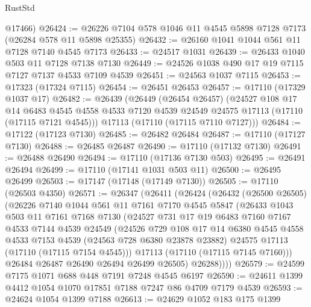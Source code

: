 \begin{lexlean}{RustStd}
\begin{coremodule}
      @17466)
@26424 := @26226 @7104 @578 @1046 @11 @4545 @5898 @7128 @7173 (@26284 @578 @11 @5898 @25355)
@26432 := @26160 @1041 @1044 @561 @11 @7128 @7140 @4545 @7173
@26433 := @24517 @1031
@26439 := @26433 @1040 @503 @11 @7128 @7138 @7130
@26449 := @24526 @1038 @490 @17 @19 @7115 @7127 @7137 @4533 @7109 @4539
@26451 := @24563 @1037 @7115
@26453 := @17323 (@17324 @7115)
@26454 := @26451 @26453
@26457 := @17110 (@17329 @1037 @17)
@26482 := @26439
    (@26449
      (@26454 @26457)
      (@24527
        @108
        @17
        @14
        @6483
        @4545
        @4558
        @4533
        @7120
        @4539
        @24549
        @24575
        @17113
        (@17110 (@17115 @7121 @4545)))
      @17113
      (@17110 (@17115 @7110 @7127)))
@26484 := @17122 (@17123 @7130)
@26485 := @26482 @26484
@26487 := @17110 (@17127 @7130)
@26488 := @26485 @26487
@26490 := @17110 (@17132 @7130)
@26491 := @26488 @26490
@26494 := @17110 (@17136 @7130 @503)
@26495 := @26491 @26494
@26499 := @17110 (@17141 @1031 @503 @11)
@26500 := @26495 @26499
@26503 := @17147 (@17148 (@17149 @7130))
@26505 := @17110 (@26503 @4350)
@26571 := @26347
    (@26411
      (@26424
        (@26432
          (@26500 @26505)
          (@26226
            @7140
            @1044
            @561
            @11
            @7161
            @7170
            @4545
            @5847
            (@26433
              @1043
              @503
              @11
              @7161
              @7168
              @7130
              (@24527
                @731
                @17
                @19
                @6483
                @7160
                @7167
                @4533
                @7144
                @4539
                @24549
                (@24526
                  @729
                  @108
                  @17
                  @14
                  @6380
                  @4545
                  @4558
                  @4533
                  @7153
                  @4539
                  (@24563 @728 @6380 @23878 @23882)
                  @24575
                  @17113
                  (@17110 (@17115 @7154 @4545)))
                @17113
                (@17110 (@17115 @7145 @7160)))
              @26484
              @26487
              @26490
              @26494
              @26499
              @26505)
            @26288))))
@26579 := @24599 @7175 @1071 @688 @448 @7191 @7248 @4545 @6197
@26590 := @24611 @1399 @4412 @1054 @1070 @17851 @7188 @7247 @86 @4709 @7179 @4539
@26593 := @24624 @1054 @1399 @7188
@26613 := @24629
    @1052
    @183
    @175
    @1399

\end{coremodule}
\end{lexlean}
